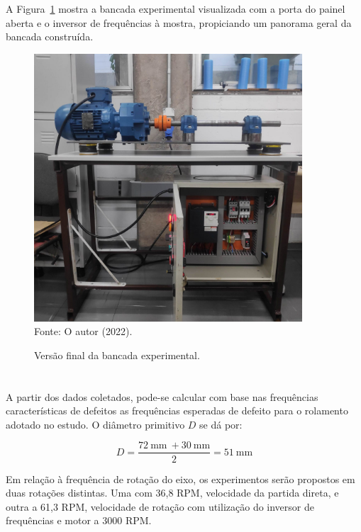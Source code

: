 \documentclass[
	12pt,				
	oneside,			
	a4paper,			
	english,			
	brazil,			
	]{abntex2ppgsi}
\begin{document}
A Figura~\ref{bancada_aberta} mostra a bancada experimental visualizada com a porta do painel aberta e o inversor de frequências à mostra, propiciando um panorama geral da bancada construída.
 
\begin{figure}[H]
\centering
\caption {Versão final da bancada experimental.}
\includegraphics[width=\textwidth,height=100mm,keepaspectratio]{bancada_aberta} \\
Fonte: O autor (2022).
\label{bancada_aberta}
\end{figure}
  
\section{}

A partir dos dados coletados, pode-se calcular com base nas frequências características de defeitos as frequências esperadas de defeito para o rolamento adotado no estudo. O diâmetro primitivo $D$ se dá por: 

\begin{equation}
	D = \frac{\SI{72}{\mm} \ + \SI{30}{\mm}}{2} = \SI{51}{\mm}
	\label{eq: Diametro Primitivo no Rolamento}
\end{equation}


Em relação à frequência de rotação do eixo, os experimentos serão propostos em duas rotações distintas. Uma com 36,8 RPM, velocidade da partida direta, e outra a 61,3 RPM, velocidade de rotação com utilização do inversor de frequências e motor a 3000 RPM.
\end{document}
